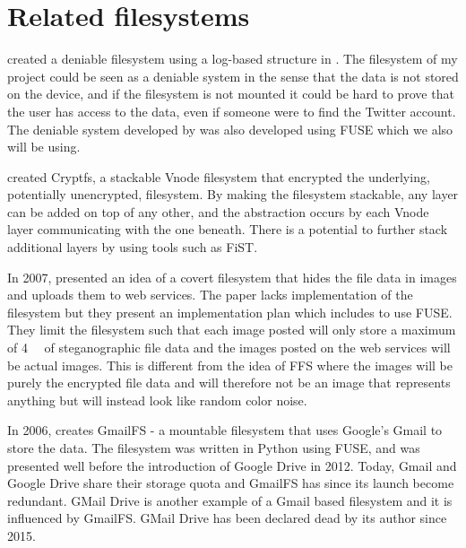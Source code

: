 \section{Related filesystems}
\citeauthor{petersDEFYDeniableFile2014} created a deniable filesystem using a log-based structure in \citeyear{petersDEFYDeniableFile2014}\cite{petersDEFYDeniableFile2014}. The filesystem of my project could be seen as a deniable system in the sense that the data is not stored on the device, and if the filesystem is not mounted it could be hard to prove that the user has access to the data, even if someone were to find the Twitter account. The deniable system developed by \citeauthor{petersDEFYDeniableFile2014} was also developed using FUSE\cite{Libfuse2021} which we also will be using.

\citeauthor{badulescuCryptfsStackableVnode1998} created Cryptfs, a stackable Vnode filesystem that encrypted the underlying, potentially unencrypted, filesystem\cite{badulescuCryptfsStackableVnode1998}. By making the filesystem stackable, any layer can be added on top of any other, and the abstraction occurs by each Vnode layer communicating with the one beneath. There is a potential to further stack additional layers by using tools such as FiST\cite{FiSTStackableFile}.

In 2007, \citeauthor{baliga2007web} presented an idea of a covert filesystem that hides the file data in images and uploads them to web services\cite{baliga2007web}. The paper lacks implementation of the filesystem but they present an implementation plan which includes to use FUSE.  They limit the filesystem such that each image posted will only store a maximum of \SI{4}{\kilo\byte} of steganographic file data and the images posted on the web services will be actual images. This is different from the idea of FFS where the images will be purely the encrypted file data and will therefore not be an image that represents anything but will instead look like random color noise.

In 2006, \citeauthor{jonesGoogleHackUse2006} creates GmailFS - a mountable filesystem that uses Google's Gmail to store the data\cite{jonesGoogleHackUse2006}\cite{jonesGmailFilesystemImplementation2006}. The filesystem was written in Python using FUSE, and was presented well before the introduction of Google Drive in 2012. Today, Gmail and Google Drive share their storage quota and GmailFS has since its launch become redundant. GMail Drive is another example of a Gmail based filesystem and it is influenced by GmailFS\cite{viksoeViksoeDkGMail2004}. GMail Drive has been declared dead by its author since 2015.
